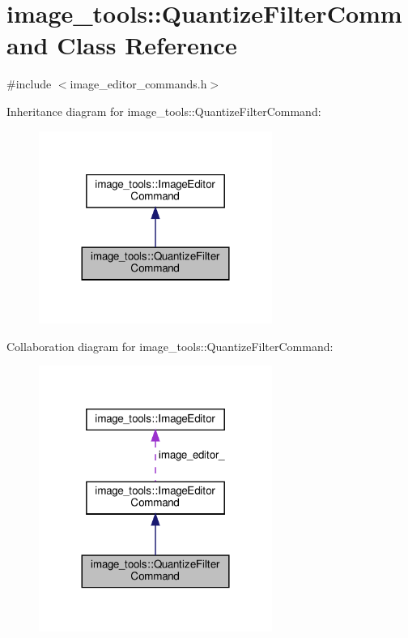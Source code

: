 \hypertarget{classimage__tools_1_1QuantizeFilterCommand}{}\section{image\+\_\+tools\+:\+:Quantize\+Filter\+Command Class Reference}
\label{classimage__tools_1_1QuantizeFilterCommand}


{\ttfamily \#include $<$image\+\_\+editor\+\_\+commands.\+h$>$}



Inheritance diagram for image\+\_\+tools\+:\+:Quantize\+Filter\+Command\+:
\nopagebreak
\begin{figure}[H]
\begin{center}
\leavevmode
\includegraphics[width=216pt]{classimage__tools_1_1QuantizeFilterCommand__inherit__graph}
\end{center}
\end{figure}


Collaboration diagram for image\+\_\+tools\+:\+:Quantize\+Filter\+Command\+:
\nopagebreak
\begin{figure}[H]
\begin{center}
\leavevmode
\includegraphics[width=216pt]{classimage__tools_1_1QuantizeFilterCommand__coll__graph}
\end{center}
\end{figure}
